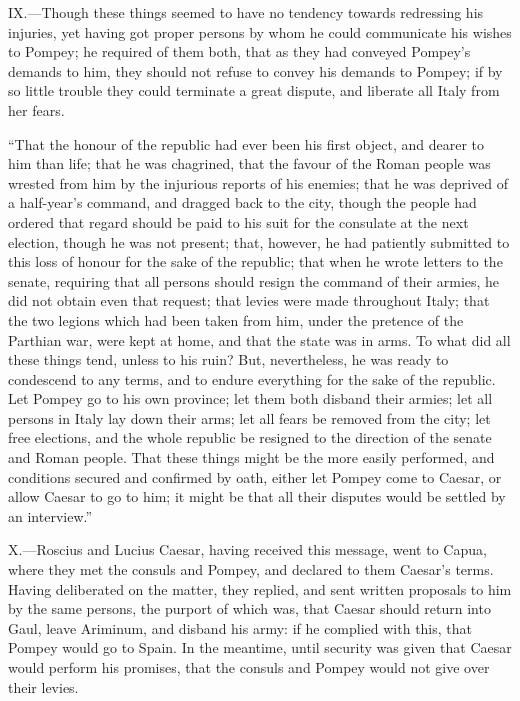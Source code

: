 IX.—Though these things seemed to have no tendency towards redressing
his injuries, yet having got proper persons by whom he could communicate
his wishes to Pompey; he required of them both, that as they had
conveyed Pompey's demands to him, they should not refuse to convey his
demands to Pompey; if by so little trouble they could terminate a great
dispute, and liberate all Italy from her fears.

``That the honour of the republic had ever been his first object, and
dearer to him than life; that he was chagrined, that the favour of the
Roman people was wrested from him by the injurious reports of his
enemies; that he was deprived of a half-year's command, and dragged back
to the city, though the people had ordered that regard should be paid to
his suit for the consulate at the next election, though he was not
present; that, however, he had patiently submitted to this loss of
honour for the sake of the republic; that when he wrote letters to the
senate, requiring that all persons should resign the command of their
armies, he did not obtain even that request; that levies were made
throughout Italy; that the two legions which had been taken from him,
under the pretence of the Parthian war, were kept at home, and that the
state was in arms. To what did all these things tend, unless to his
ruin? But, nevertheless, he was ready to condescend to any terms, and to
endure everything for the sake of the republic. Let Pompey go to his own
province; let them both disband their armies; let all persons in Italy
lay down their arms; let all fears be removed from the city; let free
elections, and the whole republic be resigned to the direction of the
senate and Roman people. That these things might be the more easily
performed, and conditions secured and confirmed by oath, either let
Pompey come to Caesar, or allow Caesar to go to him; it might be that
all their disputes would be settled by an interview.''

X.—Roscius and Lucius Caesar, having received this message, went to
Capua, where they met the consuls and Pompey, and declared to them
Caesar's terms. Having deliberated on the matter, they replied, and sent
written proposals to him by the same persons, the purport of which was,
that Caesar should return into Gaul, leave Ariminum, and disband his
army: if he complied with this, that Pompey would go to Spain. In the
meantime, until security was given that Caesar would perform his
promises, that the consuls and Pompey would not give over their levies.

